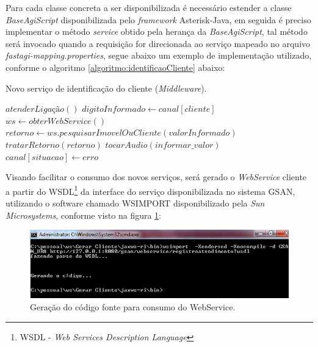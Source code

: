 Para cada classe concreta a ser disponibilizada é necessário estender a classe \textit{BaseAgiScript} disponibilizada pelo \textit{framework} Asterisk-Java, em seguida é preciso implementar o método \textit{service} obtido pela herança da \textit{BaseAgiScript}, tal método será invocado quando a requisição for direcionada ao serviço mapeado no arquivo \textit{fastagi-mapping.properties}, segue abaixo um exemplo de implementação utilizado, conforme o algoritmo \ref{algoritmo:identificaoCliente} abaixo:


\begin{algorithm}
	\caption{Novo serviço de identificação do cliente (\textit{Middleware}).}	
	\label{algoritmo:identificaoCliente}
	\begin{algorithmic}[1]
		\STATE $atenderLigação()$ 		
		\STATE $digitoInformado \gets canal[cliente]$ 	
		\STATE $ws \gets obterWebService() $ 
		\STATE $retorno \gets ws.pesquisarImovelOuCliente(valorInformado) $
		\STATE $ tratarRetorno(retorno) $
		\ELSE		
		\STATE $ tocarAudio(informar\_valor) $
		\STATE $ canal[situacao] \leftarrow erro $
		\ENDIF		
	\end{algorithmic}
\end{algorithm}


Visando facilitar o consumo dos novos serviços, será gerado o \textit{WebService} cliente a partir do WSDL\footnote{WSDL - \textit{Web Services Description Language}} da interface do serviço disponibilizada no sistema GSAN, utilizando o software chamado WSIMPORT disponibilizado pela \textit{Sun Microsystems}, conforme visto na figura \ref{figura:gerarWSCliente}:

\begin{figure}[H]
	\centering
	\caption{Geração do código fonte para consumo do WebService.}	
	\label{figura:gerarWSCliente}
	\includegraphics{figuras/gerar_wscliente.png}
\end{figure}

